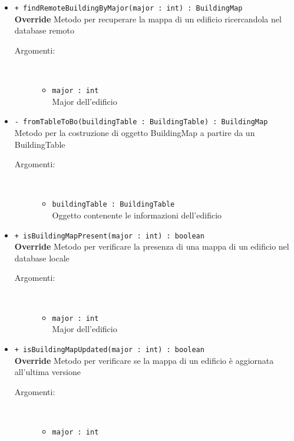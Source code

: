 \documentclass[../DefinizioneDiProdotto.tex]{subfiles}
\begin{document}
\begin{description}
\begin{itemize}
\begin{description}
		\end{description}
		\item \texttt{+ findRemoteBuildingByMajor(major : int) : BuildingMap}\\
		\textbf{Override} Metodo per recuperare la mappa di un edificio ricercandola nel database remoto
		\begin{description}
			\item[Argomenti:] \
			\begin{itemize}
				\item \texttt{major : int}\\
				Major dell'edificio\end{itemize}
		\end{description}
		\item \texttt{- fromTableToBo(buildingTable : BuildingTable) : BuildingMap}\\
		Metodo per la costruzione di oggetto BuildingMap a partire da un BuildingTable
		\begin{description}
			\item[Argomenti:] \
			\begin{itemize}
				\item \texttt{buildingTable : BuildingTable}\\
				Oggetto contenente le informazioni dell'edificio\end{itemize}
		\end{description}
		\item \texttt{+ isBuildingMapPresent(major : int) : boolean}\\
		\textbf{Override} Metodo per verificare la presenza di una mappa di un edificio nel database locale
		\begin{description}
			\item[Argomenti:] \
			\begin{itemize}
				\item \texttt{major : int}\\
				Major dell'edificio\end{itemize}
		\end{description}
		\item \texttt{+ isBuildingMapUpdated(major : int) : boolean}\\
		\textbf{Override} Metodo per verificare se la mappa di un edificio è aggiornata all'ultima versione
		\begin{description}
			\item[Argomenti:] \
			\begin{itemize}
				\item \texttt{major : int}\\

\end{itemize}
\end{description}
\end{itemize}
\end{description}
\end{document}
